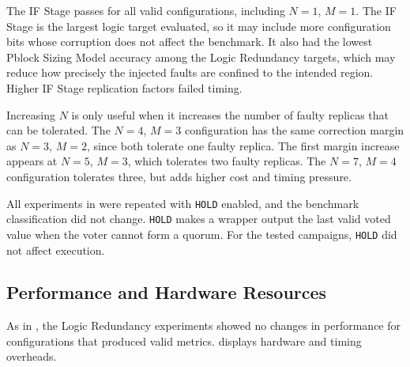 The IF Stage passes for all valid configurations, including \(N=1\), \(M=1\). The IF Stage is the largest logic target evaluated, so it may include more configuration bits whose corruption does not affect the benchmark. It also had the lowest Pblock Sizing Model accuracy among the Logic Redundancy targets, which may reduce how precisely the injected faults are confined to the intended region. Higher IF Stage replication factors failed timing.

Increasing \(N\) is only useful when it increases the number of faulty replicas that can be tolerated. The \(N=4\), \(M=3\) configuration has the same correction margin as \(N=3\), \(M=2\), since both tolerate one faulty replica. The first margin increase appears at \(N=5\), \(M=3\), which tolerates two faulty replicas. The \(N=7\), \(M=4\) configuration tolerates three, but adds higher cost and timing pressure.

All experiments in  were repeated with \texttt{HOLD} enabled, and the benchmark classification did not change. \texttt{HOLD} makes a wrapper output the last valid voted value when the voter cannot form a quorum. For the tested campaigns, \texttt{HOLD} did not affect execution.



\subsection{Performance and Hardware Resources}

As in , the Logic Redundancy experiments showed no changes in performance for configurations that produced valid metrics.  displays hardware and timing overheads.

